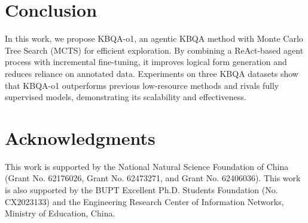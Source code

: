 \documentclass{article}
\theoremstyle{plain}
\theoremstyle{definition}
\theoremstyle{remark}
\begin{document}







\section{Conclusion}

In this work, we propose KBQA-o1, an agentic KBQA method with Monte Carlo Tree Search (MCTS) for efficient exploration. By combining a ReAct-based agent process with incremental fine-tuning, it improves logical form generation and reduces reliance on annotated data. Experiments on three KBQA datasets show that KBQA-o1 outperforms previous low-resource methods and rivals fully supervised models, demonstrating its scalability and effectiveness.

\section*{Acknowledgments}
This work is supported by the National Natural Science Foundation of China (Grant No. 62176026, Grant No. 62473271, and Grant No. 62406036). This work is also supported by the BUPT Excellent Ph.D. Students Foundation (No. CX2023133) and the Engineering Research Center of Information Networks, Ministry of Education, China.
\end{document}
